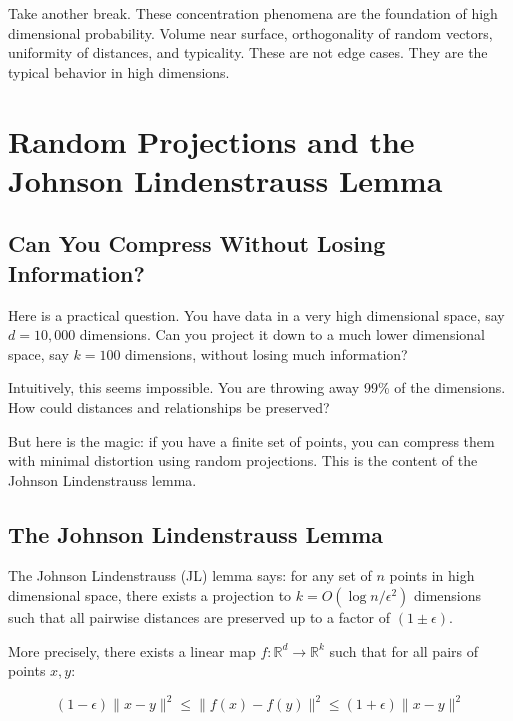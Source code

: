 \vspace{1.5em}

Take another break. These concentration phenomena are the foundation of high dimensional probability. Volume near surface, orthogonality of random vectors, uniformity of distances, and typicality. These are not edge cases. They are the typical behavior in high dimensions.

\vspace{2em}

\section{Random Projections and the Johnson Lindenstrauss Lemma}

\subsection{Can You Compress Without Losing Information?}

Here is a practical question. You have data in a very high dimensional space, say $d = 10{,}000$ dimensions. Can you project it down to a much lower dimensional space, say $k = 100$ dimensions, without losing much information?

Intuitively, this seems impossible. You are throwing away 99\% of the dimensions. How could distances and relationships be preserved?

But here is the magic: if you have a finite set of points, you can compress them with minimal distortion using random projections. This is the content of the Johnson Lindenstrauss lemma.

\vspace{1.5em}

\subsection{The Johnson Lindenstrauss Lemma}

The Johnson Lindenstrauss (JL) lemma says: for any set of $n$ points in high dimensional space, there exists a projection to $k = O(\log n / \epsilon^2)$ dimensions such that all pairwise distances are preserved up to a factor of $(1 \pm \epsilon)$.

More precisely, there exists a linear map $f: \mathbb{R}^d \to \mathbb{R}^k$ such that for all pairs of points $x, y$:

\begin{equation}
(1-\epsilon)\|x - y\|^2 \leq \|f(x) - f(y)\|^2 \leq (1+\epsilon)\|x - y\|^2
\end{equation}

